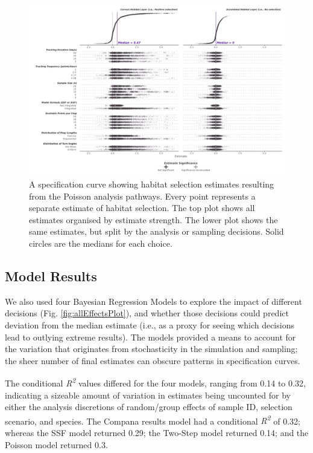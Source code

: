 \documentclass[10pt,a4paper]{article}
\begin{document}
\begin{figure}
\includegraphics[width=1\linewidth]{../figures/pois_specCurve} \caption{A specification curve showing habitat selection estimates resulting from the Poisson analysis pathways. Every point represents a separate estimate of habitat selection. The top plot shows all estimates organised by estimate strength. The lower plot shows the same estimates, but split by the analysis or sampling decisions. Solid circles are the medians for each choice.}\label{fig:specCurvePois}
\end{figure}

\subsection{Model Results}\label{model-results}

We also used four Bayesian Regression Models to explore the impact of different decisions (Fig. \ref{fig:allEffectsPlot}), and whether those decisions could predict deviation from the median estimate (i.e., as a proxy for seeing which decisions lead to outlying extreme results).
The models provided a means to account for the variation that originates from stochasticity in the simulation and sampling; the sheer number of final estimates can obscure patterns in specification curves.

The conditional \emph{R\textsuperscript{2}} values differed for the four models, ranging from 0.14 to 0.32, indicating a sizeable amount of variation in estimates being uncounted for by either the analysis discretions of random/group effects of sample ID, selection scenario, and species.
The Compana results model had a conditional \emph{R\textsuperscript{2}} of 0.32; whereas the SSF model returned 0.29; the Two-Step model returned 0.14; and the Poisson model returned 0.3.
\end{document}
